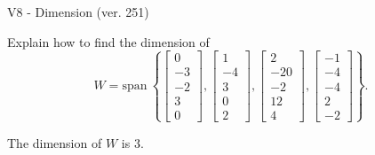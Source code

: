 \begin{exercise}
  \begin{exerciseTitle}V8 - Dimension (ver. 251)\end{exerciseTitle}
  \begin{exerciseStatement}
    Explain how to find the dimension of 
\[W=\mathrm{span}\ \left\{\left[\begin{array}{r}
0 \\
-3 \\
-2 \\
3 \\
0
\end{array}\right] , \left[\begin{array}{r}
1 \\
-4 \\
3 \\
0 \\
2
\end{array}\right] , \left[\begin{array}{r}
2 \\
-20 \\
-2 \\
12 \\
4
\end{array}\right] , \left[\begin{array}{r}
-1 \\
-4 \\
-4 \\
2 \\
-2
\end{array}\right]\right\}.\]



  \end{exerciseStatement}
  \begin{exerciseAnswer}
   The dimension of \(W\) is  \(3\).
  


  \end{exerciseAnswer}
\end{exercise}